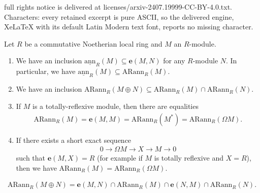 \documentclass[10pt,a4paper]{amsart}
\def\e{\boldsymbol{e}}
\newcommand{\arann}{\mathrm{ARann}}
\newcommand{\sann}{\underline{\mathrm{ann}}}
\begin{document}
full rights notice is delivered at licenses/arxiv-2407.19999-CC-BY-4.0.txt. Characters: every retained excerpt is pure ASCII, so the delivered engine, XeLaTeX with its default Latin Modern text font, reports no missing character.
    \begin{proposition}\label{first-proposition-for-auslander-reiten-annihilators}
        Let $R$ be a commutative Noetherian local ring and $M$ an $R$-module.
        \begin{enumerate}
            \item We have an inclusion $\sann_R(M) \subseteq \e(M,N)$ for any $R$-module $N$. In particular, we have $\sann_R(M) \subseteq \arann_R(M)$.
            \item We have an inclusion $\arann_R(M \oplus N) \subseteq \arann_R(M) \cap \arann_R(N)$.
            \item If $M$ is a totally-reflexive module, then there are equalities 
            \begin{align*}
                \arann_R(M) = \e(M,M) = \arann_R(M^*) = \arann_R(\Omega M).
            \end{align*}
            
            \item If there exists a short exact sequence 
            \begin{align*}
            0 \to \Omega M \to X \to M \to 0
            \end{align*}
            such that $\e(M,X) = R$ (for example if $M$ is totally reflexive and $X = R$), then we have $\arann_R(M) = \arann_R(\Omega M)$. 
        \end{enumerate}
    \end{proposition}

        \begin{align}\label{auslander-reiten-annihilator-direct-sum}
            \arann_R(M \oplus N) = \e(M,N) \cap \arann_R(M) \cap \e(N,M) \cap \arann_R(N). 
        \end{align}
\end{document}
